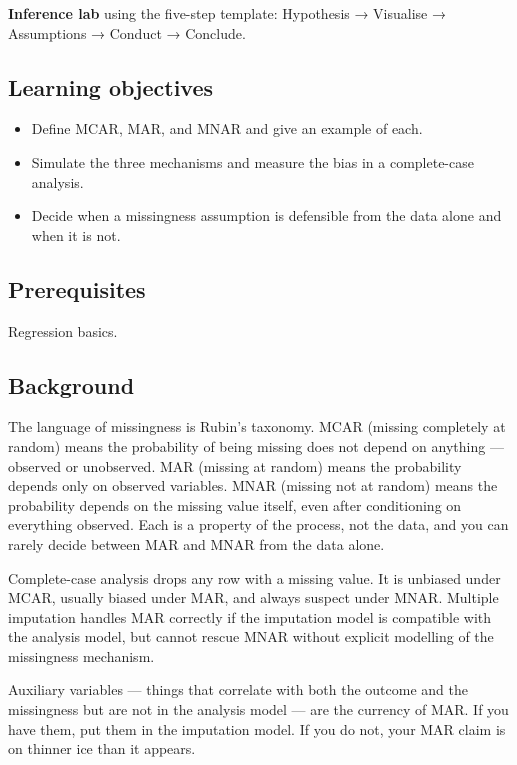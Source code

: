 \documentclass[
]{article}
\author{}
\date{\vspace{-2.5em}}
\providecommand{\tightlist}{%
  \setlength{\itemsep}{0pt}\setlength{\parskip}{0pt}}
\begin{document}
\textbf{Inference lab} using the five-step template: Hypothesis →
Visualise → Assumptions → Conduct → Conclude.

\subsection{Learning objectives}\label{learning-objectives}

\begin{itemize}
\tightlist
\item
  Define MCAR, MAR, and MNAR and give an example of each.
\item
  Simulate the three mechanisms and measure the bias in a complete-case
  analysis.
\item
  Decide when a missingness assumption is defensible from the data alone
  and when it is not.
\end{itemize}

\subsection{Prerequisites}\label{prerequisites}

Regression basics.

\subsection{Background}\label{background}

The language of missingness is Rubin's taxonomy. MCAR (missing
completely at random) means the probability of being missing does not
depend on anything --- observed or unobserved. MAR (missing at random)
means the probability depends only on observed variables. MNAR (missing
not at random) means the probability depends on the missing value
itself, even after conditioning on everything observed. Each is a
property of the process, not the data, and you can rarely decide between
MAR and MNAR from the data alone.

Complete-case analysis drops any row with a missing value. It is
unbiased under MCAR, usually biased under MAR, and always suspect under
MNAR. Multiple imputation handles MAR correctly if the imputation model
is compatible with the analysis model, but cannot rescue MNAR without
explicit modelling of the missingness mechanism.

Auxiliary variables --- things that correlate with both the outcome and
the missingness but are not in the analysis model --- are the currency
of MAR. If you have them, put them in the imputation model. If you do
not, your MAR claim is on thinner ice than it appears.
\end{document}

